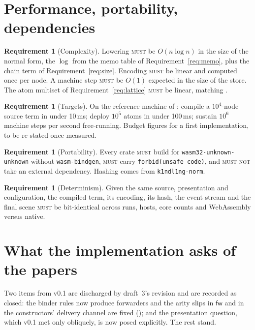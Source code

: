 \documentclass[11pt,a4paper]{article}
\newcommand{\code}[1]{\texttt{#1}}
\newcommand{\MUST}{\textsc{must}}
\newcommand{\MUSTNOT}{\textsc{must not}}
\newcommand{\fw}{\mathsf{fw}}
\theoremstyle{definition}
\newtheorem{requirement}[definition]{Requirement}
\theoremstyle{plain}
\begin{document}
\section{Performance, portability, dependencies}\label{sec:perf}

\begin{requirement}[Complexity]\label{req:complexity}
Lowering \MUST{} be $O(n \log n)$ in the size of the normal form, the $\log$
from the memo table of Requirement~\ref{req:memo}, plus the chain term of
Requirement~\ref{req:size}. Encoding \MUST{} be linear and computed once per
node. A machine step \MUST{} be $O(1)$ expected in the size of the store. The
atom multiset of Requirement~\ref{req:lattice} \MUST{} be linear, matching
\cite[Thm.~6.5]{logic}.
\end{requirement}

\begin{requirement}[Targets]\label{req:targets}
On the reference machine of \cite[\S11]{k1ndl1ng}: compile a $10^{4}$-node
source term in under 10\,ms; deploy $10^{5}$ atoms in under 100\,ms; sustain
$10^{6}$ machine steps per second free-running. Budget figures for a first
implementation, to be re-stated once measured.
\end{requirement}

\begin{requirement}[Portability]\label{req:port}
Every crate \MUST{} build for \code{wasm32-unknown-unknown} without
\code{wasm-bindgen}, \MUST{} carry \code{forbid(unsafe\_code)}, and \MUSTNOT{}
take an external dependency. Hashing comes from \code{k1ndl1ng-norm}.
\end{requirement}

\begin{requirement}[Determinism]\label{req:det}
Given the same source, presentation and configuration, the compiled term, its
encoding, its hash, the event stream and the final scene \MUST{} be
bit-identical across runs, hosts, core counts and WebAssembly versus native.
\end{requirement}

\section{What the implementation asks of the papers}\label{sec:paper}

Two items from v0.1 are discharged by draft~3's revision and are recorded as
closed: the binder rules now produce forwarders and the arity slips in $\fw$
and in the constructors' delivery channel are fixed
(\cite[Rem.~3.4]{draft3}); and the presentation question, which v0.1 met only
obliquely, is now posed explicitly. The rest stand.
\end{document}
